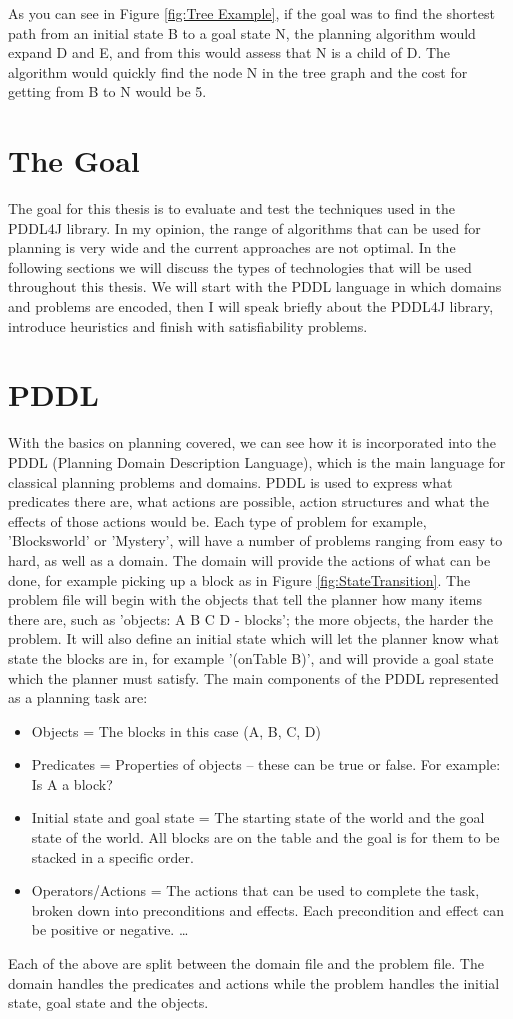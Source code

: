 As you can see in Figure \ref{fig:Tree Example}, if the goal was to find the shortest path from an initial state B to a goal state N, the planning algorithm would expand D and E, and from this would assess that N is a child of D. The algorithm would quickly find the node N in the tree graph and the cost for getting from B to N would be 5. 
\section{The Goal}
The goal for this thesis is to evaluate and test the techniques used in the PDDL4J library. In my opinion, the range of algorithms that can be used for planning is very wide and the current approaches are not optimal.  
In the following sections we will discuss the types of technologies that will be used throughout this thesis. We will start with the PDDL language in which domains and problems are encoded, then I will speak briefly about the PDDL4J library, introduce heuristics and finish with satisfiability problems.
\section{PDDL}
With the basics on planning covered, we can see how it is incorporated into the PDDL (Planning Domain Description Language), which is the main language for classical planning problems and domains. PDDL is used to express what predicates there are, what actions are possible, action structures and what the effects of those actions would be.\cite{PDDL1.2} Each type of problem for example, 'Blocksworld' or 'Mystery', will have a number of problems ranging from easy to hard, as well as a domain. The domain will provide the actions of what can be done, for example picking up a block as in Figure \ref{fig:StateTransition}. The problem file will begin with the objects that tell the planner how many items there are, such as 'objects: A B C D - blocks'; the more objects, the harder the problem. It will also define an initial state which will let the planner know what state the blocks are in, for example '(onTable B)', and will provide a goal state which the planner must satisfy. 
The main components of the PDDL represented as a planning task are:
\begin{itemize}
\item Objects = The blocks in this case (A, B, C, D)
\item Predicates = Properties of objects – these can be true or false. For example: Is A a block?  
\item  Initial state and goal state = The starting state of the world and the goal state of the world. All blocks are on the table and the goal is for them to be stacked in a specific order.
\item Operators/Actions = The actions that can be used to complete the task, broken down into preconditions and effects. Each precondition and effect can be positive or negative. \ldots
\end{itemize}
Each of the above are split between the domain file and the problem file. The domain handles the predicates and actions while the problem handles the initial state, goal state and the objects. 

